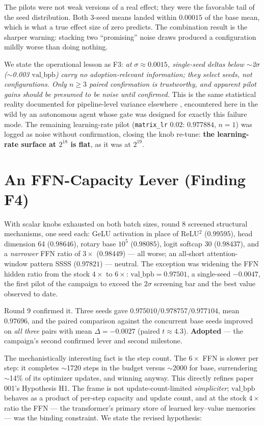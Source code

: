\documentclass{article}
\newcommand{\valbpb}{\mathrm{val\_bpb}}
\begin{document}
The pilots were not weak versions of a real effect; they were the favorable tail of the seed distribution. Both 3-seed means landed within $0.00015$ of the base mean, which is what a true effect size of zero predicts. The combination result is the sharper warning: stacking two ``promising'' noise draws produced a configuration mildly worse than doing nothing.

We state the operational lesson as F3: \emph{at $\sigma \approx 0.0015$, single-seed deltas below $\sim$2$\sigma$ ($\sim$0.003 $\valbpb$) carry no adoption-relevant information; they select seeds, not configurations. Only $n \geq 3$ paired confirmation is trustworthy, and apparent pilot gains should be presumed to be noise until confirmed.} This is the same statistical reality documented for pipeline-level variance elsewhere \cite{bouthillier2021accounting}, encountered here in the wild by an autonomous agent whose gate was designed for exactly this failure mode. The remaining learning-rate pilot (\texttt{matrix\_lr} $0.02$: $0.977884$, $n{=}1$) was logged as noise without confirmation, closing the knob re-tune: \textbf{the learning-rate surface at $2^{18}$ is flat}, as it was at $2^{19}$.

\section{An FFN-Capacity Lever (Finding F4)}
\label{sec:ffn}

With scalar knobs exhausted on both batch sizes, round 8 screened structural mechanisms, one seed each: GeLU activation in place of ReLU$^2$ ($0.99595$), head dimension 64 ($0.98646$), rotary base $10^5$ ($0.98085$), logit softcap 30 ($0.98437$), and a \emph{narrower} FFN ratio of $3\times$ ($0.98449$) --- all worse; an all-short attention-window pattern SSSS ($0.97821$) --- neutral. The exception was widening the FFN hidden ratio from the stock $4\times$ to $6\times$: $\valbpb = 0.97501$, a single-seed $-0.0047$, the first pilot of the campaign to exceed the $2\sigma$ screening bar and the best value observed to date.

Round 9 confirmed it. Three seeds gave $0.975010 / 0.978757 / 0.977104$, mean $\mathbf{0.97696}$, and the paired comparison against the concurrent base seeds improved on \emph{all three} pairs with mean $\Delta = -0.0027$ (paired $t \approx 4.3$). \textbf{Adopted} --- the campaign's second confirmed lever and second milestone.

The mechanistically interesting fact is the step count. The $6\times$ FFN is slower per step: it completes $\sim$1720 steps in the budget versus $\sim$2000 for base, surrendering $\sim$14\% of its optimizer updates, and winning anyway. This directly refines paper 001's Hypothesis H1. The frame is not update-count-limited \emph{simpliciter}; $\valbpb$ behaves as a product of per-step capacity and update count, and at the stock $4\times$ ratio the FFN --- the transformer's primary store of learned key--value memories \cite{geva2021kv} --- was the binding constraint. We state the revised hypothesis:
\end{document}
